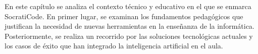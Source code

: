 En este capítulo se analiza el contexto técnico y educativo en el que se enmarca SocratiCode. En primer lugar, se examinan los fundamentos pedagógicos que justifican la necesidad de nuevas herramientas en la enseñanza de la informática. Posteriormente, se realiza un recorrido por las soluciones tecnológicas actuales y los casos de éxito que han integrado la inteligencia artificial en el aula.